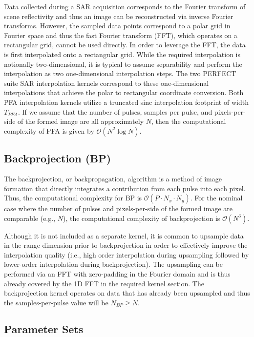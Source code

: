 \documentclass{report}
\begin{document}
Data collected during a SAR acquisition corresponds to the Fourier
transform of scene reflectivity and thus an image can be reconstructed
via inverse Fourier transforms.
However, the sampled data points correspond to a polar grid in Fourier
space and thus the fast Fourier transform (FFT), which operates on a rectangular
grid, cannot be used directly.
In order to leverage the FFT, the data is first interpolated onto a
rectangular grid.
While the required interpolation is notionally two-dimensional, it is
typical to assume separability and perform the interpolation as two
one-dimensional interpolation steps.
The two PERFECT suite SAR interpolation kernels correspond to these one-dimensional
interpolations that achieve the polar to rectangular coordinate conversion.
Both PFA interpolation kernels utilize a truncated sinc interpolation footprint
of width $T_{PFA}$.
If we assume that the number of pulses, samples per pulse, and pixels-per-side
of the formed image are all approximately $N$, then the computational complexity
of PFA is given by $\mathcal{O}(N^2 \log N)$.

\subsection{Backprojection (BP)}

The backprojection, or backpropagation, algorithm is a method of image
formation that directly integrates a contribution from each pulse into
each pixel.
Thus, the computational complexity for BP is $\mathcal{O}(P\cdot N_x\cdot N_y)$.
For the nominal case where the number of pulses and pixels-per-side of the
formed image are comparable (e.g., $N$), the computational complexity of
backprojection is $\mathcal{O}(N^3)$.

Although it is not included as a separate kernel, it is common to upsample
data in the range dimension prior to backprojection in order to effectively
improve the interpolation quality (i.e., high order interpolation during
upsampling followed by lower-order interpolation during backprojection).
The upsampling can be performed via an FFT with zero-padding in the Fourier
domain and is thus already covered by the 1D FFT in the required kernel
section.
The backprojection kernel operates on data that has already been upsampled
and thus the samples-per-pulse value will be $N_{BP} \ge N$.

\subsection{Parameter Sets}
\end{document}

